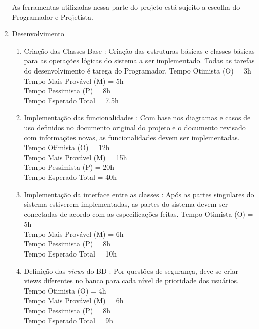 \documentclass[12pt,a4paper,final]{report}
\begin{document}
\begin{enumerate}
As ferramentas utilizadas nessa parte do projeto está sujeito a escolha do Programador e Projetista.

\item Desenvolvimento
\begin{enumerate}

\item Criação das Classes Base : Criação das estruturas básicas e classes básicas para as operações lógicas do sistema a ser implementado. Todas as tarefas do desenvolvimento é tarega do Programador.
Tempo Otimista (O) = 3h\\
Tempo Mais Provável (M) = 5h\\
Tempo Pessimista (P) = 8h\\
Tempo Esperado Total = 7.5h

\item Implementação das funcionalidades : Com base nos diagramas e casos de uso definidos no documento original do projeto e o documento revisado com informações novas, as funcionalidades devem ser implementadas.
Tempo Otimista (O) = 12h\\
Tempo Mais Provável (M) = 15h\\
Tempo Pessimista (P) = 20h\\
Tempo Esperado Total = 40h

\item Implementação da interface entre as classes : Após as partes singulares do sistema estiverem implementadas, as partes do sistema devem ser conectadas de acordo com as especificações feitas.
Tempo Otimista (O) = 5h\\
Tempo Mais Provável (M) = 6h\\
Tempo Pessimista (P) = 8h\\
Tempo Esperado Total = 10h

\item Definição das \textit{views} do BD : Por questões de segurança, deve-se criar views diferentes no banco para cada nível de prioridade dos usuários.
Tempo Otimista (O) = 4h\\
Tempo Mais Provável (M) = 6h\\
Tempo Pessimista (P) = 8h\\
Tempo Esperado Total = 9h
\end{enumerate}


\end{enumerate}
\end{document}
